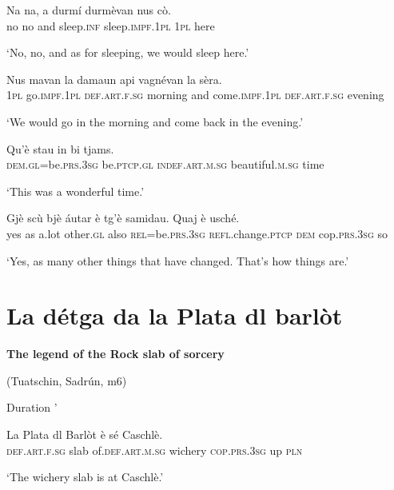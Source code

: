 \begin{linenumbers}
\gll    Na na, a durmí durmèvan nus cò. \\
no no and sleep.\textsc{inf} sleep.\textsc{impf.1pl} \textsc{1pl} here \\
\end{linenumbers}
\medskip
\glt `No, no, and as for sleeping, we would sleep here.'
\medskip

\begin{linenumbers}
\gll    Nus mavan la damaun api vagnévan la sèra. \\
 \textsc{1pl} go.\textsc{impf.1pl}  \textsc{def.art.f.sg} morning and come.\textsc{impf.1pl} \textsc{def.art.f.sg} evening \\
\end{linenumbers}
\medskip
\glt `We would go in the morning and come back in the evening.'
\medskip

\begin{linenumbers}
\gll    Qu’è stau in bi tjams. \\
 \textsc{dem.gl}=be.\textsc{prs.3sg} be.\textsc{ptcp.gl} \textsc{indef.art.m.sg} beautiful.\textsc{m.sg} time\\
\end{linenumbers}
\medskip
\glt `This was a wonderful time.'
\medskip

\begin{linenumbers}
\gll    Gjè scù bjè áutar è tg’è samidau. Quaj è usché. \\
yes as a.lot other.\textsc{gl} also \textsc{rel=}be.\textsc{prs.3sg} \textsc{refl.}change.\textsc{ptcp}  \textsc{dem} cop.\textsc{prs.3sg} so\\
\end{linenumbers}
\medskip
\glt `Yes, as many other things that have changed. That’s how things are.'
\medskip


\section{La détga da la Plata dl barlòt}


\textbf{The legend of the Rock slab of sorcery}

\noindent
(Tuatschin, Sadrún, m6)

\noindent
Duration '
\bigskip

\begin{linenumbers}
\gll    La Plata dl Barlòt è sé Caschlè.
\\
 \textsc{def.art.f.sg} slab of.\textsc{def.art.m.sg} wichery \textsc{cop.prs.3sg} up \textsc{pln}\\
\end{linenumbers}
\medskip
\glt `The wichery slab is at Caschlè.'
\medskip

